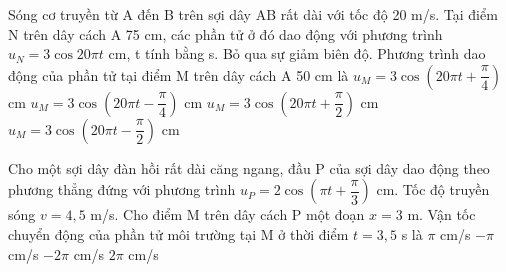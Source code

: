 \begin{ex}%
Sóng cơ truyền từ A đến B trên sợi dây AB rất dài với tốc độ 20 m/s. Tại điểm N trên dây cách A 75 cm, các phần tử ở đó dao động với phương trình $u_N = 3\cos20\pi t$ cm, t tính bằng s. Bỏ qua sự giảm biên độ. Phương trình dao động của phần tử tại điểm M trên dây cách A 50 cm là
\choice
{\True $u_M = 3\cos(20\pi t + \dfrac{\pi}{4})$ cm}
{$u_M = 3\cos(20\pi t - \dfrac{\pi}{4})$ cm}
{$u_M = 3\cos(20\pi t + \dfrac{\pi}{2})$ cm}
{$u_M = 3\cos(20\pi t - \dfrac{\pi}{2})$ cm}
\end{ex} 
\begin{ex}%
Cho một sợi dây đàn hồi rất dài căng ngang, đầu P của sợi dây dao động theo phương thẳng đứng với phương trình $u_P=2\cos(\pi t + \dfrac{\pi}{3})$ cm. Tốc độ truyền sóng $v=4,5$ m/s. Cho điểm M trên dây cách P một đoạn $x=3$ m. Vận tốc chuyển động của phần tử môi trường tại M ở thời điểm $t=3,5$ s là
\choice
{\True $\pi$ cm/s}
{$-\pi$ cm/s}
{$-2\pi$ cm/s}
{$2\pi$ cm/s}
\end{ex} 

